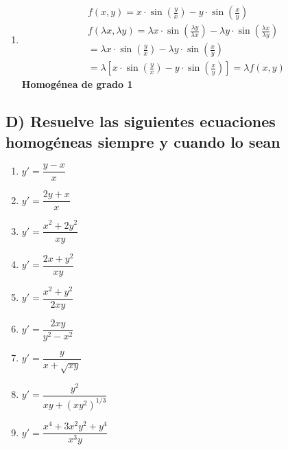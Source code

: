 \documentclass[a4paper,12pt]{article}
\begin{document}
\begin{enumerate}
    \item 
    \[
    \begin{array}{l}
    f(x,y) = x\cdot \sin\left(\frac{y}{x}\right) - y\cdot \sin\left(\frac{x}{y}\right) \\[1.2em]
    f(\lambda x, \lambda y) = \lambda x\cdot \sin\left(\frac{\lambda y}{\lambda x}\right) - \lambda y\cdot \sin\left(\frac{\lambda x}{\lambda y}\right) \\[1.2em]
    = \lambda x\cdot \sin\left(\frac{y}{x}\right) - \lambda y\cdot \sin\left(\frac{x}{y}\right) \\[1.2em]
    = \lambda\left[x\cdot \sin\left(\frac{y}{x}\right) - y\cdot \sin\left(\frac{x}{y}\right)\right] = \lambda f(x,y)
    \end{array}
    \]
    \textbf{Homogénea de grado 1}

\end{enumerate}
\subsection*{D) Resuelve las siguientes ecuaciones homogéneas siempre y cuando lo sean}
\begin{multicols}{2}
\begin{enumerate}
  \item $y' = \dfrac{y-x}{x}$
  \item $y' = \dfrac{2y+x}{x}$
  \item $y' = \dfrac{x^2+2y^2}{xy}$
  \item $y' = \dfrac{2x+y^2}{xy}$
  \item $y' = \dfrac{x^2+y^2}{2xy}$
  \item $y' = \dfrac{2xy}{y^2-x^2}$
  \item $y' = \dfrac{y}{x+\sqrt{xy}}$
  \item $y' = \dfrac{y^2}{xy+(xy^2)^{1/3}}$
  \item $y' = \dfrac{x^4+3x^2y^2+y^4}{x^3y}$
\end{enumerate}
\end{multicols}
\end{document}
